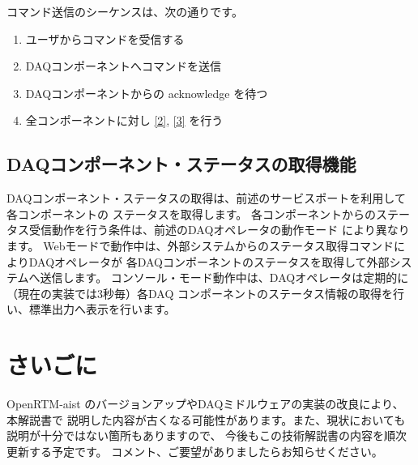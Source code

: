\documentclass[a4j,10pt,dvips,onecolumn,oneside,final]{jarticle}%
\begin{document}
コマンド送信のシーケンスは、次の通りです。
\begin{enumerate}
\item ユーザからコマンドを受信する
\item DAQコンポーネントへコマンドを送信\label{2}
\item DAQコンポーネントからの acknowledge を待つ\label{3}
\item 全コンポーネントに対し \ref{2}, \ref{3} を行う
\end{enumerate}

\subsection{DAQコンポーネント・ステータスの取得機能}
DAQコンポーネント・ステータスの取得は、前述のサービスポートを利用して各コンポーネントの
ステータスを取得します。
各コンポーネントからのステータス受信動作を行う条件は、前述のDAQオペレータの動作モード
により異なります。
Webモードで動作中は、外部システムからのステータス取得コマンドによりDAQオペレータが
各DAQコンポーネントのステータスを取得して外部システムへ送信します。
コンソール・モード動作中は、DAQオペレータは定期的に（現在の実装では3秒毎）各DAQ
コンポーネントのステータス情報の取得を行い、標準出力へ表示を行います。





\section{さいごに}
OpenRTM-aist のバージョンアップやDAQミドルウェアの実装の改良により、本解説書で
説明した内容が古くなる可能性があります。また、現状においても説明が十分ではない箇所もありますので、
今後もこの技術解説書の内容を順次更新する予定です。
コメント、ご要望がありましたらお知らせください。
\end{document}
